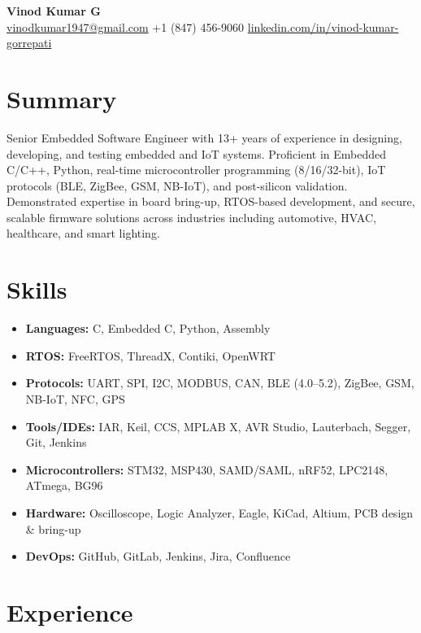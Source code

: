 \documentclass[10pt]{article}
\begin{document}
\begin{center}
    {\LARGE \textbf{Vinod Kumar G}} \\
    \href{mailto:vinodkumar1947@gmail.com}{vinodkumar1947@gmail.com} \quad
    +1 (847) 456-9060 \quad
    \href{https://www.linkedin.com/in/vinod-kumar-gorrepati}{linkedin.com/in/vinod-kumar-gorrepati} \\
    \vspace{0.2cm}
\end{center}

\section*{Summary}
Senior Embedded Software Engineer with 13+ years of experience in designing, developing, and testing embedded and IoT systems. Proficient in Embedded C/C++, Python, real-time microcontroller programming (8/16/32-bit), IoT protocols (BLE, ZigBee, GSM, NB-IoT), and post-silicon validation. Demonstrated expertise in board bring-up, RTOS-based development, and secure, scalable firmware solutions across industries including automotive, HVAC, healthcare, and smart lighting.

\section*{Skills}
\begin{itemize}[leftmargin=*]
  \item \textbf{Languages:} C, Embedded C, Python, Assembly
  \item \textbf{RTOS:} FreeRTOS, ThreadX, Contiki, OpenWRT
  \item \textbf{Protocols:} UART, SPI, I2C, MODBUS, CAN, BLE (4.0–5.2), ZigBee, GSM, NB-IoT, NFC, GPS
  \item \textbf{Tools/IDEs:} IAR, Keil, CCS, MPLAB X, AVR Studio, Lauterbach, Segger, Git, Jenkins
  \item \textbf{Microcontrollers:} STM32, MSP430, SAMD/SAML, nRF52, LPC2148, ATmega, BG96
  \item \textbf{Hardware:} Oscilloscope, Logic Analyzer, Eagle, KiCad, Altium, PCB design \& bring-up
  \item \textbf{DevOps:} GitHub, GitLab, Jenkins, Jira, Confluence
\end{itemize}

\section*{Experience}
\end{document}

